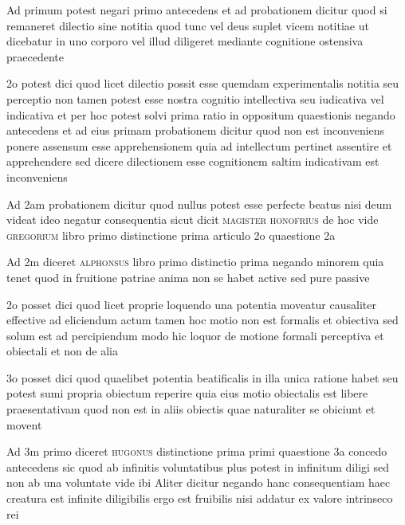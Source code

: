 \documentclass[twoside, openright]{article}
\newcommand{\name}[1]{\textsc{#1}}
\begin{document}
        \pstart
        Ad primum potest negari primo antecedens et ad probationem dicitur quod si remaneret dilectio sine notitia quod tunc vel deus suplet vicem notitiae ut dicebatur in uno corporo  vel illud diligeret mediante cognitione ostensiva praecedente
        \pend
     
        \pstart
        2o potest dici quod licet dilectio possit esse quemdam experimentalis notitia seu perceptio non tamen potest esse nostra cognitio intellectiva seu iudicativa vel indicativa et per hoc potest solvi prima ratio in oppositum quaestionis negando antecedens et ad eius primam probationem dicitur quod non est inconveniens ponere assensum esse apprehensionem quia ad intellectum pertinet assentire et apprehendere sed dicere dilectionem esse cognitionem saltim indicativam est inconveniens
        \pend
     
        \pstart
        Ad 2am probationem dicitur quod nullus potest esse perfecte beatus nisi deum videat ideo negatur consequentia sicut dicit \name{magister honofrius}\index[persons]{} de hoc vide \name{gregorium} libro primo distinctione prima articulo 2o quaestione 2a
        \pend
     
        \pstart
        Ad 2m diceret \name{alphonsus} libro primo distinctio prima negando minorem quia tenet quod in fruitione patriae anima non se habet active sed pure passive
        \pend
     
        \pstart
        2o posset dici quod licet proprie loquendo una potentia moveatur causaliter effective ad eliciendum actum tamen hoc motio non est formalis et obiectiva sed solum est ad percipiendum modo hic loquor de motione formali perceptiva et obiectali et non de alia 
        \pend
     
        \pstart
        3o posset dici quod quaelibet potentia beatificalis in illa unica ratione habet seu potest sumi propria obiectum reperire quia eius motio obiectalis est libere praesentativam quod non est in aliis obiectis quae naturaliter se obiciunt et movent
        \pend
     
        \pstart
        Ad 3m primo diceret \name{hugonus} distinctione prima primi quaestione 3a concedo antecedens sic quod ab infinitis voluntatibus plus potest in infinitum diligi sed non ab una voluntate vide ibi Aliter dicitur negando hanc consequentiam haec creatura est infinite diligibilis ergo est fruibilis nisi addatur ex valore intrinseco rei
        \pend
     
\end{document}
